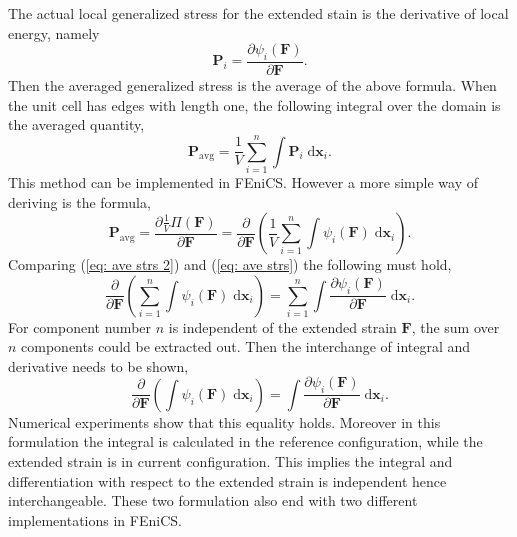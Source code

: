 \documentclass[10pt,a4paper]{scrreprt}
\newcommand{\myd}{\;\mathrm{d}}
\begin{document}
The actual local generalized stress for the extended stain is the derivative of local energy, namely
\begin{equation}
\label{eq: loc en}
\mathbf{P}_{i} = \dfrac{\partial \psi_{i}(\mathbf{F})}{\partial \mathbf{F}}.
\end{equation}
Then the averaged generalized stress is the average of the above formula. When the unit cell has edges with length one, the following integral over the domain is the averaged quantity,
\begin{equation}
\label{eq: ave strs}
\mathbf{P}_{\text{avg}} = \dfrac{1}{V}\sum^{n}_{i=1} \int \mathbf{P}_{i} \myd{\mathbf{x}_{i}}.
\end{equation}
This method can be implemented in FEniCS. However a more simple way of deriving is the formula,
\begin{equation}
\label{eq: ave strs 2}
\mathbf{P}_{\text{avg}} = \dfrac{\partial \tfrac{1}{V} \Pi(\mathbf{F})}{\partial \mathbf{F}} = \dfrac{\partial}{\partial \mathbf{F}} \left( \dfrac{1}{V} \sum^{n}_{i=1} \int \psi_{i}(\mathbf{F}) \myd{\mathbf{x}_{i}} \right).
\end{equation}
Comparing (\ref{eq: ave strs 2}) and (\ref{eq: ave strs}) the following must hold,
\begin{equation}
\label{eq: equality}
\dfrac{\partial}{\partial \mathbf{F}} \left( \sum^{n}_{i=1} \int \psi_{i}(\mathbf{F}) \myd{\mathbf{x}_{i}} \right) = \sum^{n}_{i=1} \int \dfrac{\partial \psi_{i}(\mathbf{F})}{\partial \mathbf{F}} \myd{\mathbf{x}_{i}}.
\end{equation}
For component number $n$ is independent of the extended strain $\mathbf{F}$, the sum over $n$ components could be extracted out. Then the interchange of integral and derivative needs to be shown, 
\begin{equation}
\label{eq: interchange}
\dfrac{\partial}{\partial \mathbf{F}} \left( \int \psi_{i}(\mathbf{F}) \myd{\mathbf{x}_{i}} \right) = \int \dfrac{\partial \psi_{i}(\mathbf{F})}{\partial \mathbf{F}} \myd{\mathbf{x}_{i}}.
\end{equation}
Numerical experiments show that this equality holds. Moreover in this formulation the integral is calculated in the reference configuration, while the extended strain is in current configuration. This implies the integral and differentiation with respect to the extended strain is independent hence interchangeable. These two formulation also end with two different implementations in FEniCS.
\end{document}
